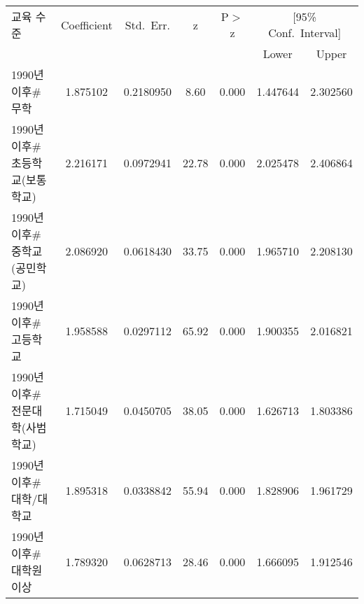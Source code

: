 \begin{tabular}{lcccccc}
\toprule
교육 수준 & Coefficient & Std.~Err. & z & P$>$z & \multicolumn{2}{c}{[95\% Conf.~Interval]} \\
\cmidrule(lr){6-7}
 &  &  &  &  & Lower & Upper \\
\midrule
1990년 이후\#무학 & 1.875102 & 0.2180950 & 8.60  & 0.000 & 1.447644 & 2.302560 \\
1990년 이후\#초등학교(보통학교) & 2.216171 & 0.0972941 & 22.78 & 0.000 & 2.025478 & 2.406864 \\
1990년 이후\#중학교(공민학교) & 2.086920 & 0.0618430 & 33.75 & 0.000 & 1.965710 & 2.208130 \\
1990년 이후\#고등학교 & 1.958588 & 0.0297112 & 65.92 & 0.000 & 1.900355 & 2.016821 \\
1990년 이후\#전문대학(사범학교) & 1.715049 & 0.0450705 & 38.05 & 0.000 & 1.626713 & 1.803386 \\
1990년 이후\#대학/대학교 & 1.895318 & 0.0338842 & 55.94 & 0.000 & 1.828906 & 1.961729 \\
1990년 이후\#대학원 이상 & 1.789320 & 0.0628713 & 28.46 & 0.000 & 1.666095 & 1.912546 \\
\bottomrule
\end{tabular}
